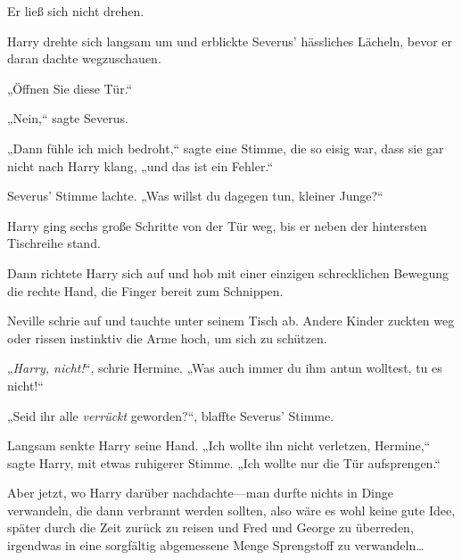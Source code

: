 Er ließ sich nicht drehen.

Harry drehte sich langsam um und erblickte Severus’ hässliches Lächeln, bevor er daran dachte wegzuschauen.

„Öffnen Sie diese Tür.“

„Nein,“ sagte Severus.

„Dann fühle ich mich bedroht,“ sagte eine Stimme, die so eisig war, dass sie gar nicht nach Harry klang, „und das ist ein Fehler.“

Severus’ Stimme lachte. „Was willst du dagegen tun, kleiner Junge?“

Harry ging sechs große Schritte von der Tür weg, bis er neben der hintersten Tischreihe stand.

Dann richtete Harry sich auf und hob mit einer einzigen schrecklichen Bewegung die rechte Hand, die Finger bereit zum Schnippen.

Neville schrie auf und tauchte unter seinem Tisch ab. Andere Kinder zuckten weg oder rissen instinktiv die Arme hoch, um sich zu schützen.

„\emph{Harry, nicht!}“, schrie Hermine. „Was auch immer du ihm antun wolltest, tu es nicht!“

„Seid ihr alle \emph{verrückt} geworden?“, blaffte Severus’ Stimme.

Langsam senkte Harry seine Hand. „Ich wollte ihn nicht verletzen, Hermine,“ sagte Harry, mit etwas ruhigerer Stimme. „Ich wollte nur die Tür aufsprengen.“

Aber jetzt, wo Harry darüber nachdachte—man durfte nichts in Dinge verwandeln, die dann verbrannt werden sollten, also wäre es wohl keine gute Idee, später durch die Zeit zurück zu reisen und Fred und George zu überreden, irgendwas in eine sorgfältig abgemessene Menge Sprengstoff zu verwandeln…

